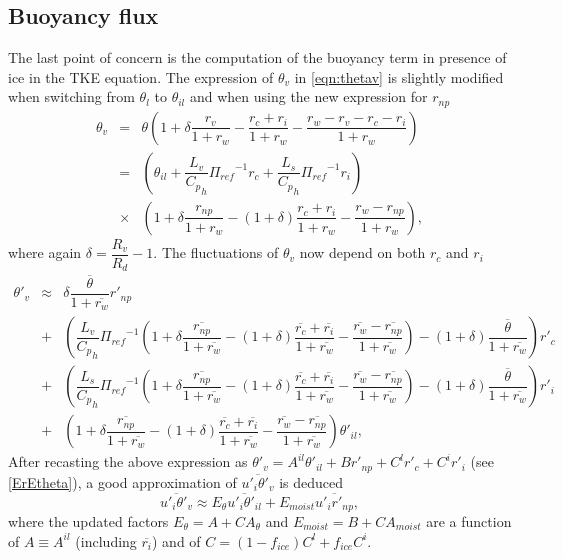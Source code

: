 \subsection{Buoyancy flux}

The last point of concern is the computation of the buoyancy term in presence of
ice in the TKE equation. The expression of $\theta_{v}$ in \ref{eqn:thetav} is
slightly modified when switching from $\theta_l$ to $\theta_{il}$ and when
using the new expression for $r_{np}$
\begin{eqnarray}\label{eqn:newthetav}
\theta_{v} &=& \theta (1+\delta\dfrac{r_{v}}{1+r_{w}}-
\dfrac{r_{c}+r_{i}}{1+r_{w}}-\dfrac{r_{w}-r_{v}-r_{c}-r_{i}}{1+r_{w}}) 
\nonumber\\
&=& \left( \theta_{il}+\dfrac{L_{v}}{{C_{p}}_{h}}{{\Pi}_{ref}}^{-1}r_{c}
                      +\dfrac{L_{s}}{{C_{p}}_{h}}{{\Pi}_{ref}}^{-1}r_{i} \right)
\nonumber\\
&\times& \left( 1+ \delta \dfrac{r_{np}}{1+r_{w}}-
(1+\delta)\dfrac{r_{c}+r_{i}}{1+r_{w}}-\dfrac{r_{w}-r_{np}}{1+r_{w}} \right),
\end{eqnarray}
where again $\delta = \dfrac{R_{v}}{R_{d}}-1$.
The fluctuations of $\theta_v$ now depend on both ${r_{c}}$ and ${r_{i}}$
\begin{eqnarray}\label{eqn:newtheta'v}
{\theta}'_{v} &\approx&
\delta \dfrac {\overline{\theta}}{1+\overline{r_{w}}} {r'_{np}}\nonumber\\
&+& \left(\dfrac{L_{v}}{{C_{p}}_{h}}{{\Pi}_{ref}}^{-1}
\left( 1+\delta \dfrac{\overline{r_{np}}}{1+\overline{r_{w}}}-
(1+\delta)\dfrac{\overline{r_{c}}+\overline{r_{i}}}{1+\overline{r_{w}}}-
\dfrac{\overline{r_{w}}-\overline{r_{np}}}{1+\overline{r_{w}}}\right)-(1+\delta)
\dfrac{\overline{\theta}}{1+\overline{r_{w}}}\right) {r'_{c}}\nonumber\\
&+& \left(\dfrac{L_{s}}{{C_{p}}_{h}}{{\Pi}_{ref}}^{-1}
\left( 1+\delta \dfrac{\overline{r_{np}}}{1+\overline{r_{w}}}-
(1+\delta)\dfrac{\overline{r_{c}}+\overline{r_{i}}}{1+\overline{r_{w}}}-
\dfrac{\overline{r_{w}}-\overline{r_{np}}}{1+\overline{r_{w}}}\right)-(1+\delta)
\dfrac{\overline{\theta}}{1+\overline{r_{w}}}\right) {r'_{i}}\nonumber\\
&+& \left(1+\delta \dfrac{\overline{r_{np}}}{1+\overline{r_{w}}} -
(1+\delta)\dfrac{\overline{r_{c}}+\overline{r_{i}}}{1+\overline{r_{w}}}
-\dfrac{\overline{r_{w}}-\overline{r_{np}}}{1+\overline{r_{w}}}\right)
{\theta}'_{il},
\end{eqnarray}
After recasting the above expression as
${\theta}'_{v}=A^{il}{\theta}'_{il}+B{r'_{np}}+C^l{r'_{c}}+C^i{r'_{i}}$
(see \ref{ErEtheta}), a good approximation of $\overline{u'_{i}\theta'_{v}}$ 
is deduced
\begin{equation} \label{newErEtheta}
\overline{{u'_{i}}{{\theta}'_{v}}} \approx 
E_{\theta} \overline{u'_{i}\theta'_{il}} +
E_{moist}  \overline{u'_{i}r'_{np}},
\end{equation}
where the updated factors $E_{\theta} = A + C A_{\theta}$ and 
$E_{moist} = B + C A_{moist}$ are a function of $A \equiv A^{il}$ (including
$\overline{r_{i}}$) and of $C=(1-f_{ice}) C^l + f_{ice} C^i$.

